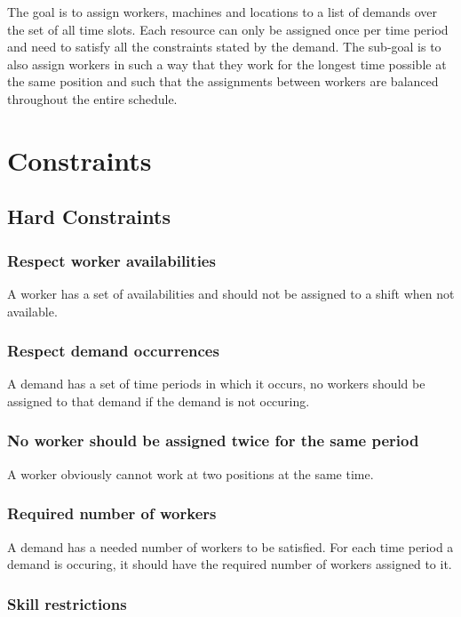 \documentclass[../thesis.tex]{subfiles}
\begin{document}
The goal is to assign workers, machines and locations to a list of demands over the set of all time slots.
Each resource can only be assigned once per time period and need to satisfy all the constraints stated by the demand. 
The sub-goal is to also assign workers in such a way that they work for the longest time possible at the same position and 
 such that the assignments between workers are balanced throughout the entire schedule.

\section{Constraints}
\subsection{Hard Constraints}

\subsubsection{Respect worker availabilities}

A worker has a set of availabilities and should not be assigned to a 
shift when not available.

\subsubsection{Respect demand occurrences}

A demand has a set of time periods in which it occurs,
no workers should be assigned to that demand if the demand is not 
occuring.

\subsubsection{No worker should be assigned twice for the same period}

A worker obviously cannot work at two positions at the same time. 

\subsubsection{Required number of workers}

A demand has a needed number of workers to be satisfied. 
For each time period a demand is occuring, it should have the required 
number of workers assigned to it.

\subsubsection{Skill restrictions}
\end{document}
